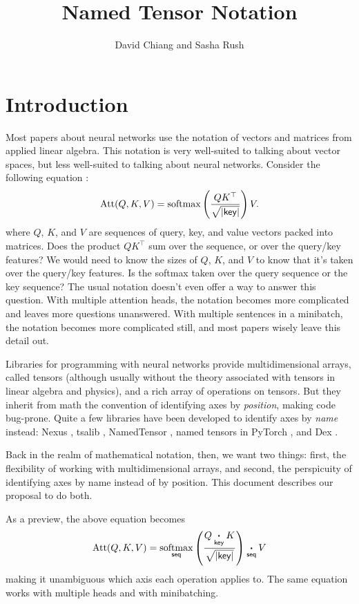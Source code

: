 \documentclass{article}
\title{Named Tensor Notation}
\author{David Chiang and Sasha Rush}
\DeclareMathOperator*{\softmax}{softmax}
\begin{document}
\maketitle

\tableofcontents

\clearpage

\section{Introduction}

Most papers about neural networks use the notation of vectors and matrices from applied linear algebra. This notation is very well-suited to talking about vector spaces, but less well-suited to talking about neural networks. Consider the following equation \citep{vaswani+:2017}:
\[ \text{Att}(Q, K, V) = \softmax \left( \frac{QK^\top}{\sqrt{|\name{key}|}} \right) V. \]
where $Q$, $K$, and $V$ are sequences of query, key, and value vectors packed into matrices. Does the product $QK^\top$ sum over the sequence, or over the query/key features? We would need to know the sizes of $Q$, $K$, and $V$ to know that it's taken over the query/key features. Is the softmax taken over the query sequence or the key sequence? The usual notation doesn't even offer a way to answer this question. With multiple attention heads, the notation becomes more complicated and leaves more questions unanswered. With multiple sentences in a minibatch, the notation becomes more complicated still, and most papers wisely leave this detail out.

Libraries for programming with neural networks \citep{numpy,pytorch} provide multidimensional arrays, called tensors (although usually without the theory associated with tensors in linear algebra and physics), and a rich array of operations on tensors. But they inherit from math the convention of identifying axes by \emph{position}, making code bug-prone. Quite a few libraries have been developed to identify axes by \emph{name} instead: Nexus \citep{chen2017typesafe}, tsalib \citep{tsalib}, NamedTensor \citep{namedtensor}, named tensors in PyTorch \citep{named-tensors}, and Dex \citep{maclaurin+:2019}.

Back in the realm of mathematical notation, then, we want two things: first, the flexibility of working with multidimensional arrays, and second, the perspicuity of identifying axes by name instead of by position. This document describes our proposal to do both.

As a preview, the above equation becomes
\begin{equation*}
  \text{Att}(Q,K,V) = \nfun{seq}{softmax} \left( \frac{Q \ndot{key} K}{\sqrt{|\name{key}|}} \right) \ndot{seq} V
\end{equation*}
making it unambiguous which axis each operation applies to. The same equation works with multiple heads and with minibatching.
\end{document}
